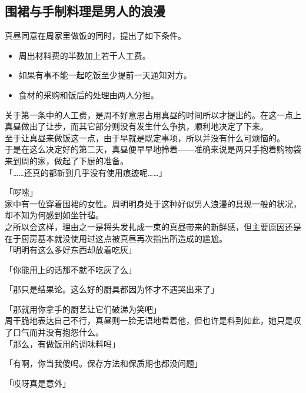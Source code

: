 \subsection{围裙与手制料理是男人的浪漫}

真昼同意在周家里做饭的同时，提出了如下条件。

\begin{itemize}
    \item 周出材料费的半数加上若干人工费。
    \item 如果有事不能一起吃饭至少提前一天通知对方。
    \item 食材的采购和饭后的处理由两人分担。
\end{itemize}

关于第一条中的人工费，是周不好意思占用真昼的时间所以才提出的。在这一点上真昼做出了让步，而其它部分则没有发生什么争执，顺利地决定了下来。\\

至于让真昼来做饭这一点，由于早就是既定事项，所以并没有什么可烦恼的。\\

于是在这么决定好的第二天，真昼便早早地拎着——准确来说是两只手抱着购物袋来到周的家，做起了下厨的准备。\\

「……还真的都新到几乎没有使用痕迹呢……」

「啰嗦」\\

家中有一位穿着围裙的女性。周明明身处于这种好似男人浪漫的具现一般的状况，却不知为何感到如坐针毡。\\

之所以会这样，理由之一是将头发扎成一束的真昼带来的新鲜感，但主要原因还是在于厨房基本就没使用过这点被真昼再次指出所造成的尴尬。\\

「明明有这么多好东西却放着吃灰」

「你能用上的话那不就不吃灰了么」

「那只是结果论。这么好的厨具都因为怀才不遇哭出来了」

「那就用你拿手的厨艺让它们破涕为笑吧」\\

周干脆地表达自己不行，真昼则一脸无语地看着他，但也许是料到如此，她只是叹了口气而并没有抱怨什么。\\

「那么，有做饭用的调味料吗」

「有啊，你当我傻吗。保存方法和保质期也都没问题」

「哎呀真是意外」


